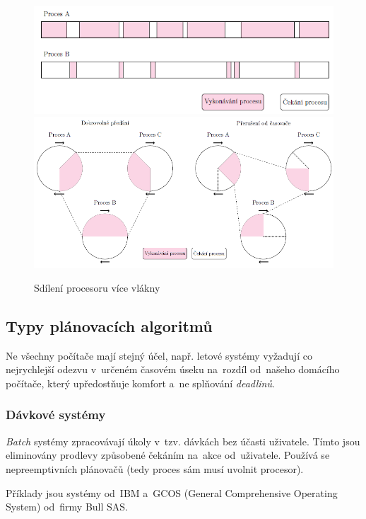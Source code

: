 \begin{figure}[ht]
	\centering
	\includegraphics[scale=1]{images/proc_changing.png}
	\includegraphics[scale=1]{images/proc_preemption.png}
	\caption{Sdílení procesoru více vlákny}
	\label{proc_changing}
\end{figure}

\subsection{Typy plánovacích algoritmů}

Ne všechny počítače mají stejný účel, např. letové systémy vyžadují co nejrychlejší odezvu v~určeném časovém úseku na~rozdíl od~našeho domácího počítače, který upředostňuje komfort a~ne splňování \emph{deadlinů}.

\subsubsection{Dávkové systémy}

\emph{Batch} systémy zpracovávají úkoly v~tzv. dávkách bez účasti uživatele. Tímto jsou eliminovány prodlevy způsobené čekáním na~akce od~uživatele. Používá se nepreemptivních plánovačů (tedy proces sám musí uvolnit procesor).

Příklady jsou systémy od~IBM a~GCOS (General Comprehensive Operating System) od~firmy Bull SAS.

